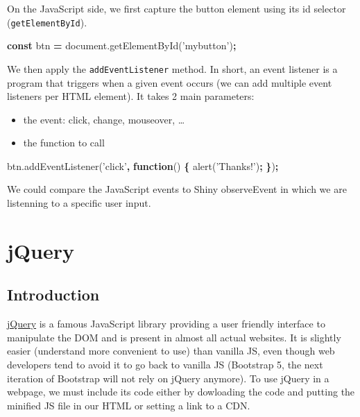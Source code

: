 \documentclass[]{book}
\newenvironment{Shaded}{\begin{snugshade}}{\end{snugshade}}
\newcommand{\AttributeTok}[1]{\textcolor[rgb]{0.77,0.63,0.00}{#1}}
\newcommand{\KeywordTok}[1]{\textcolor[rgb]{0.13,0.29,0.53}{\textbf{#1}}}
\newcommand{\NormalTok}[1]{#1}
\newcommand{\OperatorTok}[1]{\textcolor[rgb]{0.81,0.36,0.00}{\textbf{#1}}}
\newcommand{\StringTok}[1]{\textcolor[rgb]{0.31,0.60,0.02}{#1}}
\newcommand{\VariableTok}[1]{\textcolor[rgb]{0.00,0.00,0.00}{#1}}
\providecommand{\tightlist}{%
  \setlength{\itemsep}{0pt}\setlength{\parskip}{0pt}}
\begin{document}
On the JavaScript side, we first capture the button element using its id selector (\texttt{getElementById}).

\begin{Shaded}
\begin{Highlighting}[]
\KeywordTok{const}\NormalTok{ btn }\OperatorTok{=} \VariableTok{document}\NormalTok{.}\AttributeTok{getElementById}\NormalTok{(}\StringTok{'mybutton'}\NormalTok{)}\OperatorTok{;}
\end{Highlighting}
\end{Shaded}

We then apply the \texttt{addEventListener} method. In short, an event listener is a program that triggers when a given event occurs (we can add multiple event listeners per HTML element). It takes 2 main parameters:

\begin{itemize}
\tightlist
\item
  the event: click, change, mouseover, \ldots{}
\item
  the function to call
\end{itemize}

\begin{Shaded}
\begin{Highlighting}[]
\VariableTok{btn}\NormalTok{.}\AttributeTok{addEventListener}\NormalTok{(}\StringTok{'click'}\OperatorTok{,} \KeywordTok{function}\NormalTok{() }\OperatorTok{\{}
  \AttributeTok{alert}\NormalTok{(}\StringTok{'Thanks!'}\NormalTok{)}\OperatorTok{;}
\OperatorTok{\}}\NormalTok{)}\OperatorTok{;}
\end{Highlighting}
\end{Shaded}

We could compare the JavaScript events to Shiny observeEvent in which we are listenning to a specific user input.

\hypertarget{jquery}{%
\section{jQuery}\label{jquery}}

\hypertarget{introduction-1}{%
\subsection{Introduction}\label{introduction-1}}

\href{https://jquery.com}{jQuery} is a famous JavaScript library providing a user friendly interface to manipulate the DOM and is present in almost all actual websites. It is slightly easier (understand more convenient to use) than vanilla JS, even though web developers tend to avoid it to go back to vanilla JS (Bootstrap 5, the next iteration of Bootstrap will not rely on jQuery anymore). To use jQuery in a webpage, we must include its code either by dowloading the code and putting the minified JS file in our HTML or setting a link to a CDN.
\end{document}
